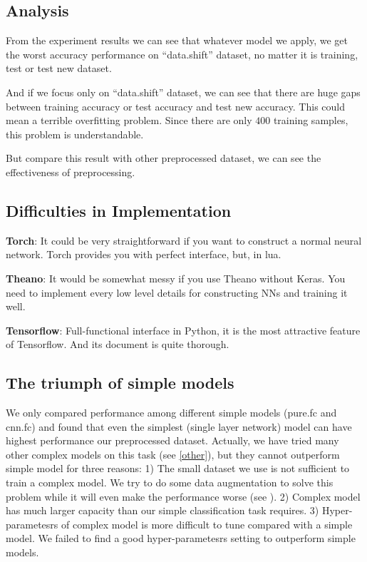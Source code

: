 \documentclass[a4paper]{article}
\begin{document}
\subsection{Analysis}

From the experiment results we can see that whatever model we apply, we get the worst accuracy performance on ``data.shift'' dataset, no matter it is training, test or test new dataset.

And if we focus only on ``data.shift'' dataset, we can see that there are huge gaps between training accuracy or test accuracy and test new accuracy. This could mean a terrible overfitting problem. Since there are only $400$ training samples, this problem is understandable.

But compare this result with other preprocessed dataset, we can see the effectiveness of preprocessing.

\subsection{Difficulties in Implementation}
{\bf Torch}: It could be very straightforward if you want to construct a normal neural network. Torch provides you with perfect interface, but, in lua.

{\bf Theano}: It would be somewhat messy if you use Theano without Keras. You need to implement every low level details for constructing NNs and training it well. 

{\bf Tensorflow}: Full-functional interface in Python, it is the most attractive feature of Tensorflow.  And its document is quite thorough.

\subsection{The triumph of simple models}
We only compared performance among different simple models (pure.fc and cnn.fc) and found that even the simplest (single layer network) model can have highest performance our preprocessed dataset. Actually, we have tried many other complex models on this task (see \ref{other}), but they cannot outperform simple model for three reasons: 1) The small dataset we use is not sufficient to train a complex model. We try to do some data augmentation to solve this problem while it will even make the performance worse (see \label{dae}). 2) Complex model has much larger capacity than our simple classification task requires. 3) Hyper-parametesrs of complex model is more difficult to tune compared with a simple model. We failed to find a good hyper-parametesrs setting to outperform simple models.


%
% 
%
\end{document}
